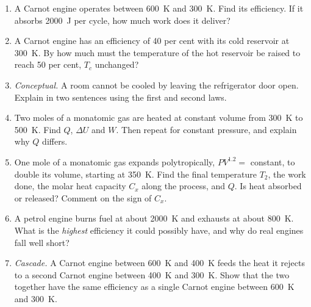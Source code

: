 \begin{enumerate}[itemsep=3pt]
\item A Carnot engine operates between \SI{600}{K} and \SI{300}{K}. Find its efficiency. If it absorbs
      \SI{2000}{J} per cycle, how much work does it deliver?
\item A Carnot engine has an efficiency of 40 per cent with its cold reservoir at \SI{300}{K}. By how much
      must the temperature of the hot reservoir be raised to reach 50 per cent, $T_c$ unchanged?
\item \emph{Conceptual.} A room cannot be cooled by leaving the refrigerator door open. Explain in two
      sentences using the first and second laws.
\item Two moles of a monatomic gas are heated at constant volume from \SI{300}{K} to \SI{500}{K}. Find
      $Q$, $\Delta U$ and $W$. Then repeat for constant pressure, and explain why $Q$ differs.
\item One mole of a monatomic gas expands polytropically, $PV^{1.2}=$ constant, to double its volume,
      starting at \SI{350}{K}. Find the final temperature $T_2$, the work done, the molar heat capacity
      $C_x$ along the process, and $Q$. Is heat absorbed or released? Comment on the sign of $C_x$.
\item A petrol engine burns fuel at about \SI{2000}{K} and exhausts at about \SI{800}{K}. What is the
      \emph{highest} efficiency it could possibly have, and why do real engines fall well short?
\item \emph{Cascade.} A Carnot engine between \SI{600}{K} and \SI{400}{K} feeds the heat it rejects to a
      second Carnot engine between \SI{400}{K} and \SI{300}{K}. Show that the two together have the same
      efficiency as a single Carnot engine between \SI{600}{K} and \SI{300}{K}.
\end{enumerate}

